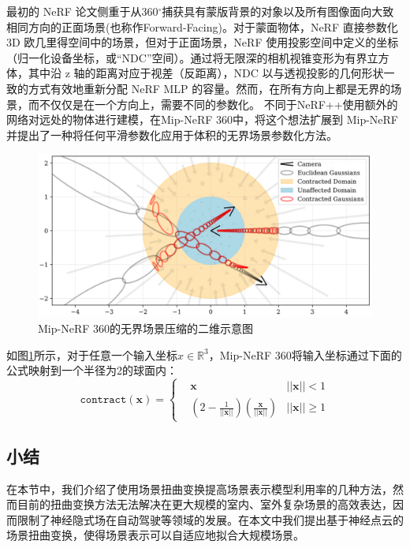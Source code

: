 最初的 NeRF 论文侧重于从360$^\circ$捕获具有蒙版背景的对象以及所有图像面向大致相同方向的正面场景(也称作Forward-Facing)。对于蒙面物体，NeRF 直接参数化 3D 欧几里得空间中的场景，但对于正面场景，NeRF 使用投影空间中定义的坐标（归一化设备坐标，或“NDC”空间）。通过将无限深的相机视锥变形为有界立方体，其中沿 z 轴的距离对应于视差（反距离），NDC 以与透视投影的几何形状一致的方式有效地重新分配 NeRF MLP 的容量。然而，在所有方向上都是无界的场景，而不仅仅是在一个方向上，需要不同的参数化。 不同于NeRF++\cite{zhang_nerf_2020}使用额外的网络对远处的物体进行建模，在Mip-NeRF 360\cite{barron_mip-nerf_2022}中，将这个想法扩展到 Mip-NeRF 并提出了一种将任何平滑参数化应用于体积的无界场景参数化方法。

\begin{figure}[ht]
    \centering
    \includegraphics[width=\textwidth]{undergraduate-thesis/images/mipnerf360-contraction.png}
    \caption{Mip-NeRF 360的无界场景压缩的二维示意图}
    \label{fig:related-work-unbounded-contraction}
\end{figure}

如图\ref{fig:related-work-unbounded-contraction}所示，对于任意一个输入坐标$x\in\mathbb{R}^3$，Mip-NeRF 360将输入坐标通过下面的公式映射到一个半径为2的球面内：
\begin{equation}
    \mathtt{contract}(\mathbf{x}) = \left\{\begin{matrix}&\mathbf{x}&||\mathbf{x}||<1\\&(2-\frac{1}{||\mathbf{x}||})(\frac{\mathbf{x}}{||\mathbf{x}||})&||\mathbf{x}||\geq1\end{matrix}\right.
\end{equation}

\subsection{小结}
在本节中，我们介绍了使用场景扭曲变换提高场景表示模型利用率的几种方法，然而目前的扭曲变换方法无法解决在更大规模的室内、室外复杂场景的高效表达，因而限制了神经隐式场在自动驾驶等领域的发展。在本文中我们提出基于神经点云的场景扭曲变换，使得场景表示可以自适应地拟合大规模场景。


